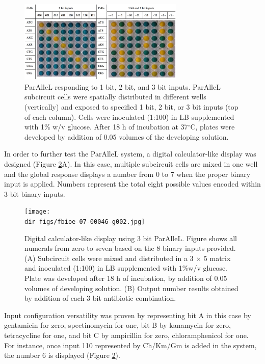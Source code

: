 \begin{figure}[h]
  \centering
  \includegraphics[width=0.7\textwidth]{chapter1/chapter/figs/fbioe-07-00046-g001.jpg}
  \caption{ParAlleL responding to 1 bit, 2 bit, and 3 bit inputs. ParAlleL subcircuit cells were spatially distributed in different wells (vertically) and exposed to specified 1 bit, 2 bit, or 3 bit inputs (top of each column). Cells were inoculated (1:100) in LB supplemented with 1\% w/v glucose. After 18 h of incubation at 37$^\circ$C, plates were developed by addition of 0.05 volumes of the developing solution.}
  \label{fig.parallel1}
\end{figure}

In order to further test the ParAlleL system, a digital calculator-like display was designed (Figure \ref{fig.parallel2}A). In this case, multiple subcircuit cells are mixed in one well and the global response displays a number from 0 to 7 when the proper binary input is applied. Numbers represent the total eight possible values encoded within 3-bit binary inputs.

\begin{figure}[htbp]
  \centering
  \texttt{[image: \\dir figs/fbioe-07-00046-g002.jpg]}
  \caption{Digital calculator-like display using 3 bit ParAlleL. Figure shows all numerals from zero to seven based on the 8 binary inputs provided. (A) Subcircuit cells were mixed and distributed in a 3 × 5 matrix and inoculated (1:100) in LB supplemented with 1\%w/v glucose. Plate was developed after 18 h of incubation, by addition of 0.05 volumes of developing solution. (B) Output number results obtained by addition of each 3 bit antibiotic combination.}
  \label{fig.parallel2}
\end{figure}

Input configuration versatility was proven by representing bit A in this case by gentamicin for zero, spectinomycin for one, bit B by kanamycin for zero, tetracycline for one, and bit C by ampicillin for zero, chloramphenicol for one. For instance, once input 110 represented by Ch/Km/Gm is added in the system, the number 6 is displayed (Figure \ref{fig.parallel2}).

